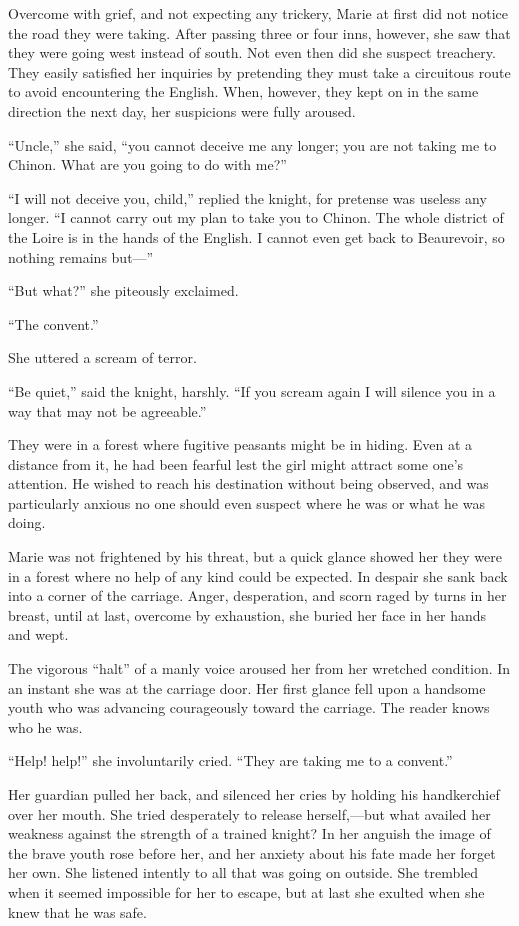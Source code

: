 Overcome with grief, and not expecting any trickery, Marie at first did
not notice the road they were taking. After passing three or four inns,
however, she saw that they were going west instead of south. Not even
then did she suspect treachery. They easily satisfied her inquiries by
pretending they must take a circuitous route to avoid encountering the
English. When, however, they kept on in the same direction the next day,
her suspicions were fully aroused.

``Uncle,'' she said, ``you cannot deceive me any longer; you are not
taking me to Chinon. What are you going to do with me?''

``I will not deceive you, child,'' replied the knight, for pretense was
useless any longer. ``I cannot carry out my plan to take you to Chinon.
The whole district of the Loire is in the hands of the English. I cannot
even get back to Beaurevoir, so nothing remains but---''

``But what?'' she piteously exclaimed.

``The convent.''

She uttered a scream of terror.

``Be quiet,'' said the knight, harshly. ``If you scream again I will
silence you in a way that may not be agreeable.''

They were in a forest where fugitive peasants might be in hiding. Even
at a distance from it, he had been fearful lest the girl might attract
some one's attention. He wished to reach his destination without being
observed, and was particularly anxious no one should even suspect where
he was or what he was doing.

Marie was not frightened by his threat, but a quick glance showed her
they were in a forest where no help of any kind could be expected. In
despair she sank back into a corner of the carriage. Anger, desperation,
and scorn raged by turns in her breast, until at last, overcome by
exhaustion, she buried her face in her hands and wept.

The vigorous ``halt'' of a manly voice aroused her from her wretched
condition. In an instant she was at the carriage door. Her first glance
fell upon a handsome youth who was advancing courageously toward the
carriage. The reader knows who he was.

``Help! help!'' she involuntarily cried. ``They are taking me to a
convent.''

Her guardian pulled her back, and silenced her cries by holding his
handkerchief over her mouth. She tried desperately to release
herself,---but what availed her weakness against the strength of a
trained knight? In her anguish the image of the brave youth rose before
her, and her anxiety about his fate made her forget her own. She
listened intently to all that was going on outside. She trembled when it
seemed impossible for her to escape, but at last she exulted when she
knew that he was safe.

